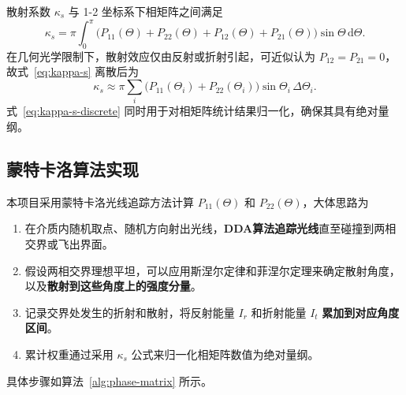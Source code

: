 \documentclass[UTF8,a4paper,12pt]{ctexart}
\begin{document}
散射系数 $\kappa_s$ 与 1-2 坐标系下相矩阵之间满足
\begin{equation}
  \kappa_s = \pi \int_0^\pi
  \bigl(P_{11}(\Theta)+P_{22}(\Theta)+P_{12}(\Theta)+P_{21}(\Theta)\bigr)
  \sin\Theta\,\mathrm{d}\Theta.
  \label{eq:kappa-s}
\end{equation}
在几何光学限制下，散射效应仅由反射或折射引起，可近似认为 $P_{12}=P_{21}=0$，故式~\eqref{eq:kappa-s} 离散后为
\begin{equation}
  \kappa_s \approx \pi \sum_i
  \bigl(P_{11}(\Theta_i)+P_{22}(\Theta_i)\bigr)
  \sin\Theta_i\,\Delta\Theta_i.
  \label{eq:kappa-s-discrete}
\end{equation}
式~\eqref{eq:kappa-s-discrete} 同时用于对相矩阵统计结果归一化，确保其具有绝对量纲。

\subsection{蒙特卡洛算法实现}

本项目采用蒙特卡洛光线追踪方法计算 $P_{11}(\Theta)$ 和 $P_{22}(\Theta)$，大体思路为
\begin{enumerate}
  \item 在介质内随机取点、随机方向射出光线，\textbf{DDA算法追踪光线}直至碰撞到两相交界或飞出界面。
  \item 假设两相交界理想平坦，可以应用斯涅尔定律和菲涅尔定理来确定散射角度，以及\textbf{散射到这些角度上的强度分量}。
  \item 记录交界处发生的折射和散射，将反射能量 $I_r$ 和折射能量 $I_t$ \textbf{累加到对应角度区间}。
  \item 累计权重通过采用 $\kappa_s$ 公式来归一化相矩阵数值为绝对量纲。
\end{enumerate}
具体步骤如算法~\ref{alg:phase-matrix} 所示。
\end{document}
